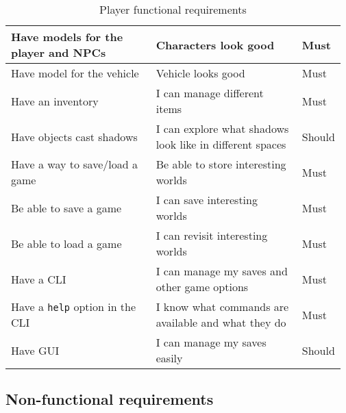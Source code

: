 \documentclass[12pt]{article}
\begin{document}
\begin{table}[H]
\begin{tabular}{p{0.45\linewidth}|p{0.45\linewidth}|p{0.07\linewidth}}
		Have models for the player and NPCs                       & Characters look good                                               & Must           \\ \hline
		Have model for the vehicle                                & Vehicle looks good                                                 & Must           \\ \hline
		Have an inventory                                         & I can manage different items                                       & Must           \\ \hline
		Have objects cast shadows                                 & I can explore what shadows look like in different spaces           & Should         \\ \hline
		Have a way to save/load a game                            & Be able to store interesting worlds                                & Must           \\ \hline
		Be able to save a game                                    & I can save interesting worlds                                      & Must           \\ \hline
		Be able to load a game                                    & I can revisit interesting worlds                                   & Must           \\ \hline
		Have a CLI                                                & I can manage my saves and other game options                       & Must           \\ \hline
		Have a \texttt{help} option in the CLI                    & I know what commands are available and what they do                & Must           \\ \hline
		Have GUI                                                  & I can manage my saves easily                                       & Should         \\ \hline
	\end{tabular}
	\caption{Player functional requirements}
\end{table}

\subsection{Non-functional requirements}
\end{document}
